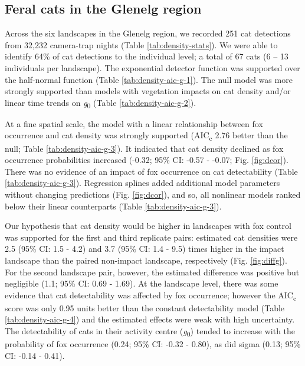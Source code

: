 \documentclass[11pt,a4paper,titlepage,twoside,openright]{style/unimelbthesis}
\begin{document}
\begin{mainmatter}
\hypertarget{feral-cats-in-the-glenelg-region}{%
\subsection{Feral cats in the Glenelg region}\label{feral-cats-in-the-glenelg-region}}

Across the six landscapes in the Glenelg region, we recorded 251 cat detections from 32,232 camera-trap nights (Table \ref{tab:density-stats}). We were able to identify 64\% of cat detections to the individual level; a total of 67 cats (6 -- 13 individuals per landscape). The exponential detector function was supported over the half-normal function (Table \ref{tab:density-aic-g-1}). The null model was more strongly supported than models with vegetation impacts on cat density and/or linear time trends on \emph{g}\textsubscript{0} (Table \ref{tab:density-aic-g-2}).

At a fine spatial scale, the model with a linear relationship between fox occurrence and cat density was strongly supported (AIC\textsubscript{c} 2.76 better than the null; Table \ref{tab:density-aic-g-3}). It indicated that cat density declined as fox occurrence probabilities increased (-0.32; 95\% CI: -0.57 - -0.07; Fig. \ref{fig:dcor}). There was no evidence of an impact of fox occurrence on cat detectability (Table \ref{tab:density-aic-g-3}). Regression splines added additional model parameters without changing predictions (Fig. \ref{fig:dcor}), and so, all nonlinear models ranked below their linear counterparts (Table \ref{tab:density-aic-g-3}).

Our hypothesis that cat density would be higher in landscapes with fox control was supported for the first and third replicate pairs: estimated cat densities were 2.5 (95\% CI: 1.5 - 4.2) and 3.7 (95\% CI: 1.4 - 9.5) times higher in the impact landscape than the paired non-impact landscape, respectively (Fig. \ref{fig:diffg}). For the second landscape pair, however, the estimated difference was positive but negligible (1.1; 95\% CI: 0.69 - 1.69). At the landscape level, there was some evidence that cat detectability was affected by fox occurrence; however the AIC\textsubscript{c} score was only 0.95 units better than the constant detectability model (Table \ref{tab:density-aic-g-4}) and the estimated effects were weak with high uncertainty. The detectability of cats in their activity centre (\emph{g}\textsubscript{0}) tended to increase with the probability of fox occurrence (0.24; 95\% CI: -0.32 - 0.80), as did sigma (0.13; 95\% CI: -0.14 - 0.41).


\end{mainmatter}
\end{document}
